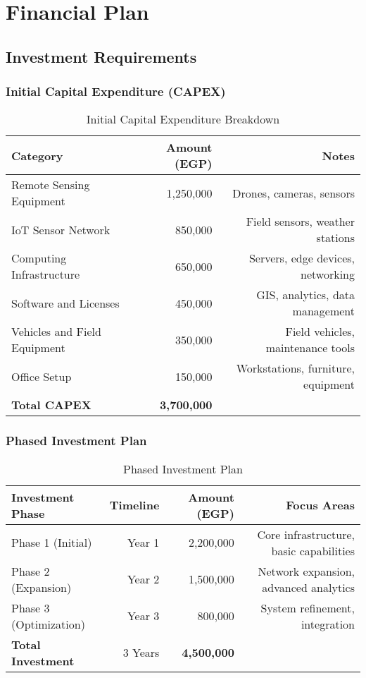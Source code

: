 \section{Financial Plan}

\subsection{Investment Requirements}

\subsubsection{Initial Capital Expenditure (CAPEX)}
\begin{table}[H]
\centering
\begin{tabular}{lrr}
\toprule
\textbf{Category} & \textbf{Amount (EGP)} & \textbf{Notes} \\
\midrule
Remote Sensing Equipment & 1,250,000 & Drones, cameras, sensors \\
IoT Sensor Network & 850,000 & Field sensors, weather stations \\
Computing Infrastructure & 650,000 & Servers, edge devices, networking \\
Software and Licenses & 450,000 & GIS, analytics, data management \\
Vehicles and Field Equipment & 350,000 & Field vehicles, maintenance tools \\
Office Setup & 150,000 & Workstations, furniture, equipment \\
\midrule
\textbf{Total CAPEX} & \textbf{3,700,000} & \\
\bottomrule
\end{tabular}
\caption{Initial Capital Expenditure Breakdown}
\end{table}

\subsubsection{Phased Investment Plan}
\begin{table}[H]
\centering
\begin{tabular}{lrrr}
\toprule
\textbf{Investment Phase} & \textbf{Timeline} & \textbf{Amount (EGP)} & \textbf{Focus Areas} \\
\midrule
Phase 1 (Initial) & Year 1 & 2,200,000 & Core infrastructure, basic capabilities \\
Phase 2 (Expansion) & Year 2 & 1,500,000 & Network expansion, advanced analytics \\
Phase 3 (Optimization) & Year 3 & 800,000 & System refinement, integration \\
\midrule
\textbf{Total Investment} & 3 Years & \textbf{4,500,000} & \\
\bottomrule
\end{tabular}
\caption{Phased Investment Plan}
\end{table}

